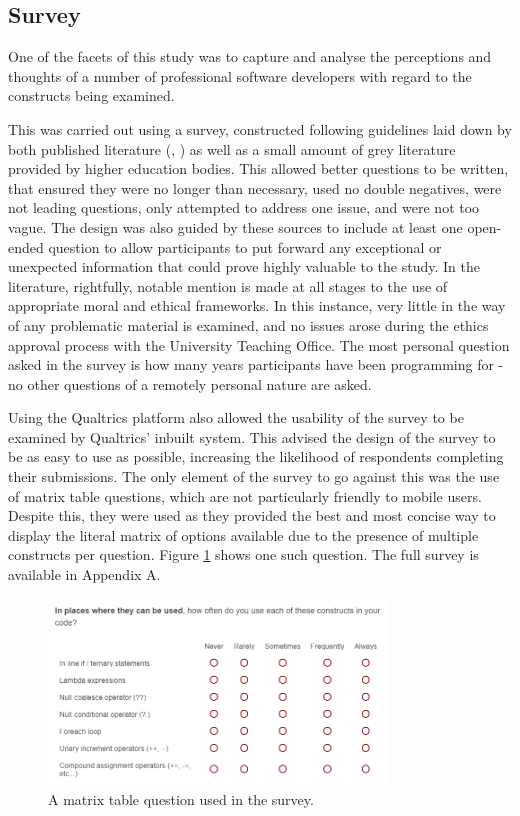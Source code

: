 \documentclass{article}
\begin{document}
    \subsection{Survey}
    \label{subsec:survey}
        One of the facets of this study was to capture and analyse the perceptions and thoughts of a number of professional software developers with regard to the constructs being examined.
        
        This was carried out using a survey, constructed following guidelines laid down by both published literature (\cite{goodSurveys1}, \cite{goodSurveys2}) as well as a small amount of grey literature provided by higher education bodies. This allowed better questions to be written, that ensured they were no longer than necessary, used no double negatives, were not leading questions, only attempted to address one issue, and were not too vague. The design was also guided by these sources to include at least one open-ended question to allow participants to put forward any exceptional or unexpected information that could prove highly valuable to the study. In the literature, rightfully, notable mention is made at all stages to the use of appropriate moral and ethical frameworks. In this instance, very little in the way of any problematic material is examined, and no issues arose during the ethics approval process with the University Teaching Office. The most personal question asked in the survey is how many years participants have been programming for - no other questions of a remotely personal nature are asked.

        Using the Qualtrics platform also allowed the usability of the survey to be examined by Qualtrics' inbuilt system. This advised the design of the survey to be as easy to use as possible, increasing the likelihood of respondents completing their submissions. The only element of the survey to go against this was the use of matrix table questions, which are not particularly friendly to mobile users. Despite this, they were used as they provided the best and most concise way to display the literal matrix of options available due to the presence of multiple constructs per question. Figure \ref{fig:matrixTable} shows one such question. The full survey is available in Appendix A.
        
        \begin{figure}[htbp]
            \centering
            \includegraphics[width=0.8\textwidth]{matrixTable}
            \caption{A matrix table question used in the survey.}
            \label{fig:matrixTable}
        \end{figure}
\end{document}
